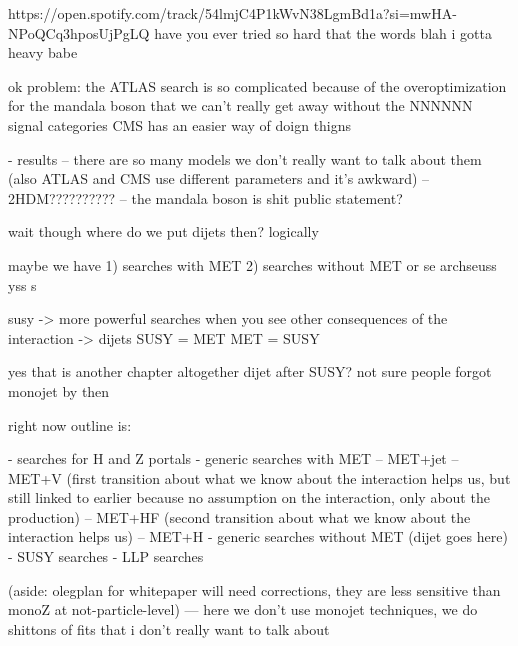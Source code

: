 https://open.spotify.com/track/54lmjC4P1kWvN38LgmBd1a?si=mwHA-NPoQCq3hposUjPgLQ
have you ever tried so hard that the words blah
i gotta heavy babe



ok problem: the ATLAS search is so complicated because of the overoptimization for the mandala boson that we can't really get away without the NNNNNN signal categories 
CMS has an easier way of doign thigns


- results 
-- there are so many models we don't really want to talk about them (also ATLAS and CMS use different parameters and it's awkward)
-- 2HDM??????????
-- the mandala boson is shit public statement?








wait though
where do we put dijets then? logically

maybe we have 1) searches with MET 2) searches without MET
or 
se
archseuss yss
s

susy -> more powerful searches when you see other consequences of the interaction -> dijets
SUSY = MET
MET = SUSY


yes that is another chapter altogether
dijet after SUSY?
not sure
people forgot monojet by then

right now outline is:

- searches for H and Z portals
- generic searches with MET
-- MET+jet
-- MET+V
(first transition about what we know about the interaction helps us, but still linked to earlier because no assumption on the interaction, only about the production)
-- MET+HF
(second transition about what we know about the interaction helps us)
-- MET+H
- generic searches without MET (dijet goes here)
- SUSY searches
- LLP searches


(aside: olegplan for whitepaper will need corrections, they are less sensitive than monoZ at not-particle-level)
--- here we don't use monojet techniques, we do shittons of fits that i don't really want to talk about

